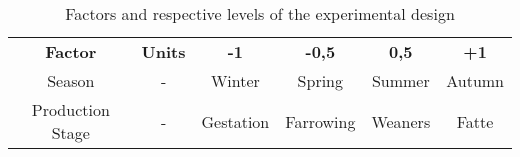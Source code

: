 \begin{table}[]
\centering
\caption{Factors and respective levels of the experimental design}
\label{table4}
\begin{tabular}{cccccc}
\textbf{Factor}  & \textbf{Units} & \textbf{-1} & \textbf{-0,5} & \textbf{0,5} & \textbf{+1} \\
Season           & -              & Winter      & Spring        & Summer       & Autumn      \\
Production Stage & -              & Gestation   & Farrowing     & Weaners      & Fatte  
\end{tabular}
\end{table}